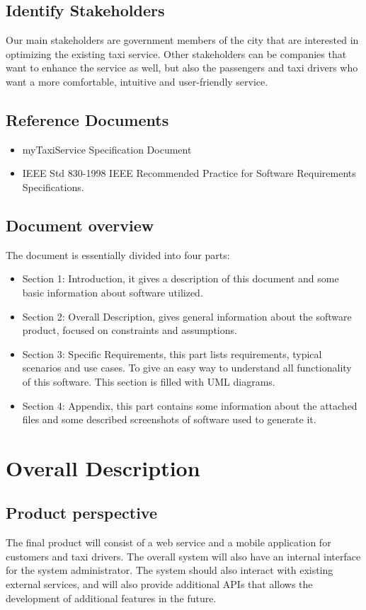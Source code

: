 \documentclass[a4paper,12pt]{article}%
\newcounter{assumptions_counter}
\newcounter{func_req_counter}
\begin{document}
\subsection{Identify Stakeholders}
Our main stakeholders are government members of the city that are interested in optimizing the existing taxi service.
Other stakeholders can be companies that want to enhance the service as well, but also the passengers and taxi drivers who want a more comfortable, intuitive and user-friendly service.
\subsection{Reference Documents}
\begin{itemize}
\item myTaxiService Specification Document
\item IEEE Std 830-1998 IEEE Recommended Practice for Software 
Requirements Specifications.
\end{itemize}
\subsection{Document overview}
The document is essentially divided into four parts:
\begin{itemize}
\item Section 1: Introduction, it gives a description of this document and some basic information about software utilized.
\item Section 2: Overall Description, gives general information about the software product, focused on constraints and assumptions.
\item Section 3: Specific Requirements, this part lists requirements, typical scenarios and use cases. To give an easy way to understand all functionality
of this software. This section is filled with UML diagrams.
\item  Section 4: Appendix, this part contains some information about the attached files and some described screenshots of software used to generate
it.
\end{itemize}
\newpage
\section{Overall Description}
\subsection{Product perspective}
The final product will consist of a web service and a mobile application for customers and taxi drivers.
The overall system will also have an internal interface for the system administrator. The system should also interact with existing external services, and will also provide additional APIs that allows the development of additional features in the future. 
\end{document}
